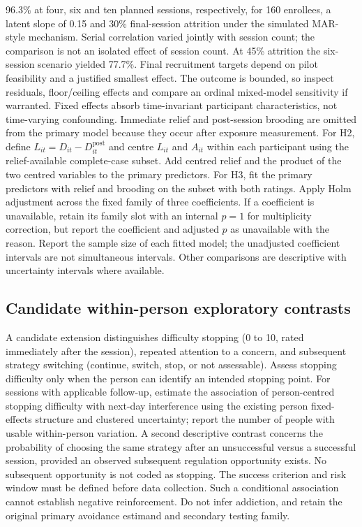 \documentclass[11pt]{article}
\begin{document}
96.3\% at four, six and ten planned sessions, respectively, for 160 enrollees, a latent slope of 0.15 and 30\% final-session attrition under the simulated MAR-style mechanism. Serial correlation varied jointly with session count; the comparison is not an isolated effect of session count. At 45\% attrition the six-session scenario yielded 77.7\%. Final recruitment targets depend on pilot feasibility and a justified smallest effect. The outcome is bounded, so inspect residuals, floor/ceiling effects and compare an ordinal mixed-model sensitivity if warranted. Fixed effects absorb time-invariant participant characteristics, not time-varying confounding. Immediate relief and post-session brooding are omitted from the primary model because they occur after exposure measurement. For H2, define $L_{it}=D_{it}-D^{\mathrm{post}}_{it}$ and centre $L_{it}$ and $A_{it}$ within each participant using the relief-available complete-case subset. Add centred relief and the product of the two centred variables to the primary predictors. For H3, fit the primary predictors with relief and brooding on the subset with both ratings. Apply Holm adjustment across the fixed family of three coefficients. If a coefficient is unavailable, retain its family slot with an internal $p=1$ for multiplicity correction, but report the coefficient and adjusted $p$ as unavailable with the reason. Report the sample size of each fitted model; the unadjusted coefficient intervals are not simultaneous intervals. Other comparisons are descriptive with uncertainty intervals where available.
\subsection{Candidate within-person exploratory contrasts}
A candidate extension distinguishes difficulty stopping (0 to 10, rated immediately after the session), repeated attention to a concern, and subsequent strategy switching (continue, switch, stop, or not assessable). Assess stopping difficulty only when the person can identify an intended stopping point. For sessions with applicable follow-up, estimate the association of person-centred stopping difficulty with next-day interference using the existing person fixed-effects structure and clustered uncertainty; report the number of people with usable within-person variation. A second descriptive contrast concerns the probability of choosing the same strategy after an unsuccessful versus a successful session, provided an observed subsequent regulation opportunity exists. No subsequent opportunity is not coded as stopping. The success criterion and risk window must be defined before data collection. Such a conditional association cannot establish negative reinforcement. Do not infer addiction, and retain the original primary avoidance estimand and secondary testing family.
\end{document}
